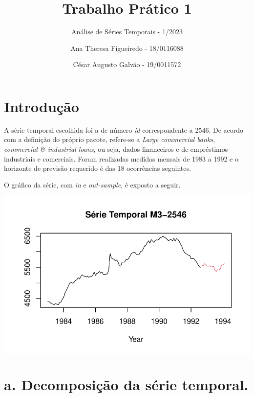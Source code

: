 \documentclass[
  letterpaper,
  DIV=11,
  numbers=noendperiod]{scrartcl}
\title{Trabalho Prático 1}
\subtitle{Análise de Séries Temporais - 1/2023}
\author{Ana Theresa Figueiredo - 18/0116088 \and César Augusto Galvão -
19/0011572}
\date{}
\renewcommand*\contentsname{Table of contents}
\newcommand\contentsname{Table of contents}
\begin{document}
\maketitle
\ifdefined\Shaded\renewenvironment{Shaded}{\begin{tcolorbox}[enhanced, frame hidden, sharp corners, interior hidden, borderline west={3pt}{0pt}{shadecolor}, breakable, boxrule=0pt]}{\end{tcolorbox}}\fi

\renewcommand*\contentsname{Table of contents}
{
\hypersetup{linkcolor=}
\setcounter{tocdepth}{3}
\tableofcontents
}
\newpage{}

\hypertarget{introduuxe7uxe3o}{%
\section{Introdução}\label{introduuxe7uxe3o}}

A série temporal escolhida foi a de número \emph{id} correspondente a
2546. De acordo com a definição do próprio pacote, refere-se a
\emph{Large commercial banks, commercial \& industrial loans}, ou seja,
dados financeiros e de empréstimos industriais e comerciais. Foram
realizadas medidas mensais de 1983 a 1992 e o horizonte de previsão
requerido é das 18 ocorrências seguintes.

O gráfico da série, com \emph{in} e \emph{out-sample}, é exposto a
seguir.

\includegraphics{T1_grupo15_files/figure-pdf/plot-serie-total-1.pdf}

\hypertarget{a.-decomposiuxe7uxe3o-da-suxe9rie-temporal.}{%
\section{a. Decomposição da série
temporal.}\label{a.-decomposiuxe7uxe3o-da-suxe9rie-temporal.}}
\end{document}
